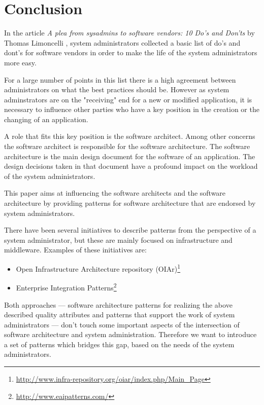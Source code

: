 \section{Conclusion} 

In the article \textit{A plea from sysadmins to software vendors: 10 Do's and Don'ts} by Thomas Limoncelli \cite{Limoncelli2011a}, system administrators collected a basic list of do's and dont's for software vendors in order to make the life of the system administrators more easy. 

For a large number of points in this list there is a high agreement between administrators on what the best practices should be. However as system adminstrators are on the "receiving" end for a new or modified application, it is necessary to influence other parties who have a key position in the creation or the changing of an application. 

A role that fits this key position is the software architect. Among other concerns the software architect is responsible for the software architecture. The software architecture is the main design document for the software of an application. The design decisions taken in that document have a profound impact on the workload of the system administrators. 

This paper aims at influencing the software architects and the software architecture by providing patterns for software architecture that are endorsed by system administrators.

There have been several initiatives to describe patterns from the perspective of a system administrator, but these are mainly focused on infrastructure and middleware. Examples of these initiatives are: 
\begin{itemize}
	\item Open Infrastructure Architecture repository (OIAr)\footnote{\url{http://www.infra-repository.org/oiar/index.php/Main_Page}} 
	\item Enterprise Integration Patterns\footnote{\url{http://www.eaipatterns.com/}}
\end{itemize}

Both approaches --- software architecture patterns for realizing the above described quality attributes and patterns that support the work of system administrators --- don't touch some important aspects of the intersection of software architecture and system administration. Therefore we want to introduce a set of patterns which bridges this gap, based on the needs of the system administrators. 

